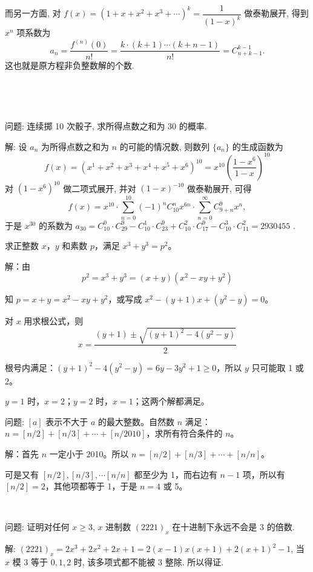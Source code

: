 而另一方面, 对 $ f(x) = (1+x+x^2+x^3+\cdots)^k = \dfrac{1}{(1-x)^k}$ 做泰勒展开, 得到 $x^n$ 项系数为
\[
a_n = \frac{f^{(n)}(0)}{n!} = \frac{k\cdot(k+1)\cdots(k+n-1)}{n!} = C^{k-1}_{n+k-1}.
\]
这也就是原方程非负整数解的个数.

~

~

问题: 连续掷 10 次骰子, 求所得点数之和为 30 的概率.

解: 设 $a_n$ 为所得点数之和为 $n$ 的可能的情况数, 则数列 $\{a_n\}$ 的生成函数为
\[
f(x) = (x^1+x^2+x^3+x^4+x^5+x^6)^{10} = x^{10}\left(\frac{1-x^6}{1-x}\right)^{10}
\]
对 $(1-x^6)^{10}$ 做二项式展开, 并对 $(1-x)^{-10}$ 做泰勒展开, 可得
\[
f(x) = x^{10}\cdot\sum_{n=0}^{10}{(-1)^nC_{10}^nx^{6n}} \cdot \sum_{n=0}^{\infty}{C_{9+n}^9x^n},
\]
于是 $x^{30}$ 的系数为 $a_{30} = C_{10}^0\cdot C_{29}^9 - C_{10}^1\cdot C_{23}^9 + C_{10}^2\cdot C_{17}^9 - C_{10}^3\cdot C_{11}^2 = 2930455$ .


\newpage
求正整数 $ x $，$ y $ 和素数 $ p $，满足 $ x^3+y^3=p^2 $。

解：由 
\begin{equation*}
p^2=x^3+y^3=(x+y)(x^2-xy+y^2 )
\end{equation*}

知 $ p=x+y=x^2-xy+y^2 $，或写成 $ x^2-(y+1)x+(y^2-y)=0 $。

对 $ x $ 用求根公式，则
\[ 
x=\frac{(y+1)\pm\sqrt{(y+1)^2-4(y^2-y)}}{2} 
\]

根号内满足：$ (y+1)^2-4(y^2-y)=6y-3y^2+1\ge 0 $，所以 $ y $ 只可能取 1 或 2。

$ y=1 $ 时，$ x=2 $；$ y=2 $ 时，$ x=1 $；这两个解都满足。

\newpage
问题: $ [a] $ 表示不大于 $ a $ 的最大整数。自然数 $ n $ 满足：$ n=[n/2]+[n/3]+\cdots +[n/2010] $，求所有符合条件的 $ n $。

解：首先 $ n $ 一定小于 2010。所以 $ n=[n/2]+[n/3]+\cdots +[n/n] $。

可是又有 $ [n/2],[n/3],\cdots [n/n] $ 都至少为 1，而右边有 $ n-1 $ 项，所以有 $ [n/2]=2 $，其他项都等于 1，于是 $ n=4 $ 或 5。

~

问题: 证明对任何 $x\ge 3$, $x$ 进制数 $(2221)_x$ 在十进制下永远不会是 3 的倍数.

解: $(2221)_x = 2x^3+2x^2+2x+1 = 2(x-1)x(x+1)+2(x+1)^2-1$, 当 $x$ 模 3 等于 $0,1,2$ 时, 该多项式都不能被 3 整除. 所以得证.


